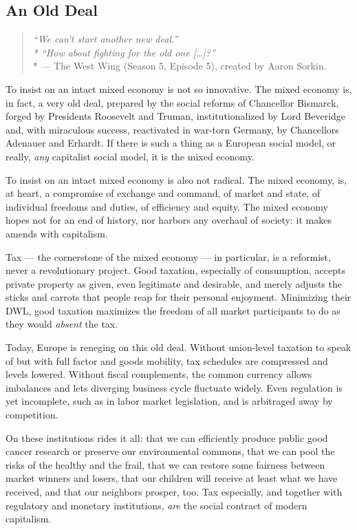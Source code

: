 \subsection[An Old Deal]{An Old Deal}

\begin{quote}
	\emph{``We can't start another new deal.''
	\\*
	``How about fighting for the old one [\ldots]?''}
	\\*
	--- The West Wing (Season 5, Episode 5), created by Aaron Sorkin.
\end{quote}

To insist on an intact mixed economy is not so innovative.
The mixed economy is, in fact, a very old deal, prepared by the social reforms of Chancellor Bismarck, forged by Presidents Roosevelt and Truman, institutionalized by Lord Beveridge and, with miraculous success, reactivated in war-torn Germany, by Chancellors Adenauer and Erhardt.
If there is such a thing as a European social model, or really, \emph{any} capitalist social model, it is the mixed economy.

To insist on an intact mixed economy is also not radical.
The mixed economy, is, at heart, a compromise of exchange and command, of market and state, of individual freedoms and duties, of efficiency and equity.
The mixed economy hopes not for an end of history, nor harbors any overhaul of society:
it makes amends with capitalism.

Tax --- the cornerstone of the mixed economy --- in particular, is a reformist, never a revolutionary project.
Good taxation, especially of consumption, accepts private property as given, even legitimate and desirable, and merely adjusts the sticks and carrots that people reap for their personal enjoyment.
Minimizing their \gls{DWL}, good taxation maximizes the freedom of all market participants to do as they would \emph{absent} the tax.

Today, Europe is reneging on this old deal.
Without union-level taxation to speak of but with full factor and goods mobility, tax schedules are compressed and levels lowered.
Without fiscal complements, the common currency allows imbalances and lets diverging business cycle fluctuate widely.
Even regulation is yet incomplete, such as in labor market legislation, and is arbitraged away by competition.

On these institutions rides it all:
that we can efficiently produce public good cancer research or preserve our environmental commons, that we can pool the risks of the healthy and the frail, that we can restore some fairness between market winners and losers, that our children will receive at least what we have received, and that our neighbors prosper, too.
Tax especially, and together with regulatory and monetary institutions, \emph{are} the social contract of modern capitalism.

